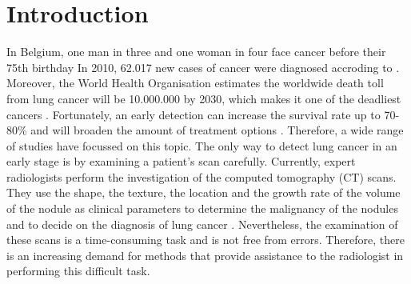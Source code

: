 \section{Introduction}
In Belgium, one man in three and one woman in four face cancer before their 75th
birthday \cite{kanker} In 2010, 62.017 new cases of cancer were diagnosed
accroding to \cite{kankerliga}. Moreover, the World Health Organisation
estimates the worldwide death toll from lung cancer will be 10.000.000 by 2030,
which makes it one of the deadliest cancers \cite{gu, zheng}. Fortunately, an
early detection can increase the survival rate up to 70-80\% \cite{swensen} and
will broaden the amount of treatment options \cite{greenlee}. Therefore, a wide
range of studies have focussed on this topic. The only way to detect lung cancer
in an early stage is by examining a patient's scan carefully. Currently, expert
radiologists perform the investigation of the computed tomography (CT) scans.
They use the shape, the texture, the location and the growth rate of the volume
of the nodule as clinical parameters to determine the malignancy of the nodules
and to decide on the diagnosis of lung cancer \cite{wu}. Nevertheless, the
examination of these scans is a time-consuming task and is not free from errors.
Therefore, there is an increasing demand for methods that provide assistance
to the radiologist in performing this difficult task.


